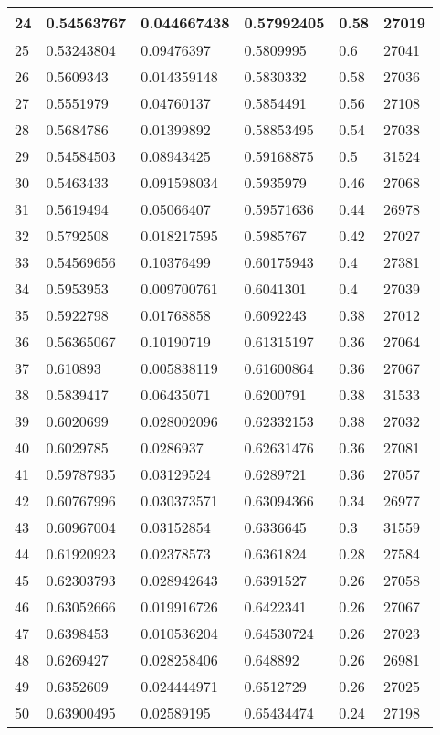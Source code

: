 \begin{longtable}{|l|l|l|l|l|l|}
24 & 0.54563767 & 0.044667438 & 0.57992405 & 0.58 & 27019 \\ \hline 
25 & 0.53243804 & 0.09476397 & 0.5809995 & 0.6 & 27041 \\ \hline 
26 & 0.5609343 & 0.014359148 & 0.5830332 & 0.58 & 27036 \\ \hline 
27 & 0.5551979 & 0.04760137 & 0.5854491 & 0.56 & 27108 \\ \hline 
28 & 0.5684786 & 0.01399892 & 0.58853495 & 0.54 & 27038 \\ \hline 
29 & 0.54584503 & 0.08943425 & 0.59168875 & 0.5 & 31524 \\ \hline 
30 & 0.5463433 & 0.091598034 & 0.5935979 & 0.46 & 27068 \\ \hline 
31 & 0.5619494 & 0.05066407 & 0.59571636 & 0.44 & 26978 \\ \hline 
32 & 0.5792508 & 0.018217595 & 0.5985767 & 0.42 & 27027 \\ \hline 
33 & 0.54569656 & 0.10376499 & 0.60175943 & 0.4 & 27381 \\ \hline 
34 & 0.5953953 & 0.009700761 & 0.6041301 & 0.4 & 27039 \\ \hline 
35 & 0.5922798 & 0.01768858 & 0.6092243 & 0.38 & 27012 \\ \hline 
36 & 0.56365067 & 0.10190719 & 0.61315197 & 0.36 & 27064 \\ \hline 
37 & 0.610893 & 0.005838119 & 0.61600864 & 0.36 & 27067 \\ \hline 
38 & 0.5839417 & 0.06435071 & 0.6200791 & 0.38 & 31533 \\ \hline 
39 & 0.6020699 & 0.028002096 & 0.62332153 & 0.38 & 27032 \\ \hline 
40 & 0.6029785 & 0.0286937 & 0.62631476 & 0.36 & 27081 \\ \hline 
41 & 0.59787935 & 0.03129524 & 0.6289721 & 0.36 & 27057 \\ \hline 
42 & 0.60767996 & 0.030373571 & 0.63094366 & 0.34 & 26977 \\ \hline 
43 & 0.60967004 & 0.03152854 & 0.6336645 & 0.3 & 31559 \\ \hline 
44 & 0.61920923 & 0.02378573 & 0.6361824 & 0.28 & 27584 \\ \hline 
45 & 0.62303793 & 0.028942643 & 0.6391527 & 0.26 & 27058 \\ \hline 
46 & 0.63052666 & 0.019916726 & 0.6422341 & 0.26 & 27067 \\ \hline 
47 & 0.6398453 & 0.010536204 & 0.64530724 & 0.26 & 27023 \\ \hline 
48 & 0.6269427 & 0.028258406 & 0.648892 & 0.26 & 26981 \\ \hline 
49 & 0.6352609 & 0.024444971 & 0.6512729 & 0.26 & 27025 \\ \hline 
50 & 0.63900495 & 0.02589195 & 0.65434474 & 0.24 & 27198 \\ \hline 
\end{longtable}